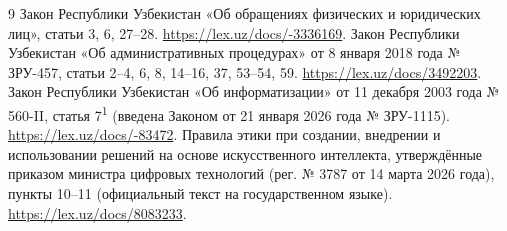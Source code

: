 \documentclass[14pt,a4paper]{extarticle}
\begin{document}
\begin{thebibliography}{9}
 Закон Республики Узбекистан «Об обращениях физических и юридических лиц», статьи 3, 6, 27–28. \url{https://lex.uz/docs/-3336169}.
 Закон Республики Узбекистан «Об административных процедурах» от 8 января 2018 года № ЗРУ-457, статьи 2–4, 6, 8, 14–16, 37, 53–54, 59. \url{https://lex.uz/docs/3492203}.
 Закон Республики Узбекистан «Об информатизации» от 11 декабря 2003 года № 560-II, статья 7\textsuperscript{1} (введена Законом от 21 января 2026 года № ЗРУ-1115). \url{https://lex.uz/docs/-83472}.
 Правила этики при создании, внедрении и использовании решений на основе искусственного интеллекта, утверждённые приказом министра цифровых технологий (рег. № 3787 от 14 марта 2026 года), пункты 10–11 (официальный текст на государственном языке). \url{https://lex.uz/docs/8083233}.
\end{thebibliography}\endgroup
\end{document}
